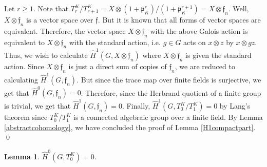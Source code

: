 \documentclass[11pt]{amsart}
\theoremstyle{plain}
\newtheorem{lemma}[enumi]{Lemma}
\begin{document}
Let $r \geq 1$.  Note that $T_r^K / T_{r+1}^K = X \otimes (1 + \mathfrak{p}_K^r) / (1 + \mathfrak{p}_K^{r+1}) = X \otimes \mathfrak{f}_n$.  Well, $X \otimes \mathfrak{f}_n$ is a vector space over $\mathfrak{f}$.  But it is known that all forms of vector spaces are equivalent.  Therefore, the vector space $X \otimes \mathfrak{f}_n$ with the above Galois action is equivalent to $X \otimes \mathfrak{f}_n$ with the standard action, i.e. $g \in G$ acts on $x \otimes z$ by $x \otimes gz$.   Thus, we wish to calculate $\hat{H}^1(G, X \otimes \mathfrak{f}_n)$ where $X \otimes \mathfrak{f}_n$ is given the standard action.  Since $X \otimes \mathfrak{f}_n$ is just a direct sum of copies of $\mathfrak{f}_n$, we are reduced to calculating $\hat{H}^1(G, \mathfrak{f}_n)$.  But since the trace map over finite fields is surjective, we get that $\hat{H}^0(G, \mathfrak{f}_n) = 0$.  Therefore, since the Herbrand quotient of a finite group is trivial, we get that $\hat{H}^1(G, \mathfrak{f}_n) = 0$.  Finally, $\hat{H}^1(G, T_0^K / T_1^K) = 0$ by Lang's theorem since $T_0^K / T_1^K$ is a connected algebraic group over a finite field.  By Lemma \ref{abstractcohomology}, we have concluded the proof of Lemma \ref{H1compactpart}.
\qed

\begin{lemma}\label{H0compactpart}
$\hat{H}^0(G,T_0^K) = 0$.
\end{lemma}
\end{document}
